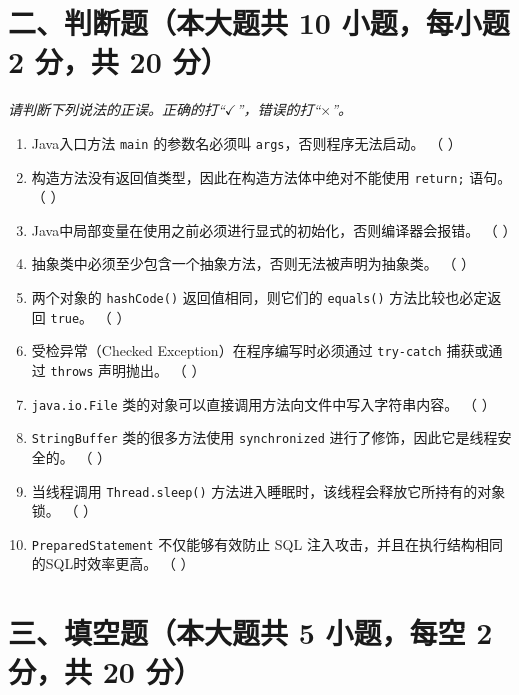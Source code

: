 \documentclass[a3paper, landscape, 11pt, twocolumn]{article}
\begin{document}
\section*{二、判断题（本大题共 10 小题，每小题 2 分，共 20 分）}
\textit{请判断下列说法的正误。正确的打“$\checkmark$”，错误的打“$\times$”。}

\begin{enumerate}[label=\arabic*., itemsep=0.8em]
	\item Java入口方法 \texttt{main} 的参数名必须叫 \texttt{args}，否则程序无法启动。 （ \quad ）
	\item 构造方法没有返回值类型，因此在构造方法体中绝对不能使用 \texttt{return;} 语句。 （ \quad ）
	\item Java中局部变量在使用之前必须进行显式的初始化，否则编译器会报错。 （ \quad ）
	\item 抽象类中必须至少包含一个抽象方法，否则无法被声明为抽象类。 （ \quad ）
	\item 两个对象的 \texttt{hashCode()} 返回值相同，则它们的 \texttt{equals()} 方法比较也必定返回 \texttt{true}。 （ \quad ）
	\item 受检异常（Checked Exception）在程序编写时必须通过 \texttt{try-catch} 捕获或通过 \texttt{throws} 声明抛出。 （ \quad ）
	\item \texttt{java.io.File} 类的对象可以直接调用方法向文件中写入字符串内容。 （ \quad ）
	\item \texttt{StringBuffer} 类的很多方法使用 \texttt{synchronized} 进行了修饰，因此它是线程安全的。 （ \quad ）
	\item 当线程调用 \texttt{Thread.sleep()} 方法进入睡眠时，该线程会释放它所持有的对象锁。 （ \quad ）
	\item \texttt{PreparedStatement} 不仅能够有效防止 SQL 注入攻击，并且在执行结构相同的SQL时效率更高。 （ \quad ）
\end{enumerate}

\section*{三、填空题（本大题共 5 小题，每空 2 分，共 20 分）}
\end{document}
